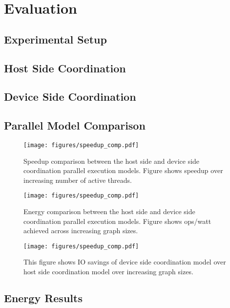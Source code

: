 
\section{Evaluation} \label{sec:eval}

\subsection{Experimental Setup}

\subsection{Host Side Coordination}

\subsection{Device Side Coordination}

\subsection{Parallel Model Comparison}

\begin{figure}[t]
	\centering
	\texttt{[image: figures/speedup\_comp.pdf]}
	\caption{Speedup comparison between the host side and device side coordination parallel execution models. Figure shows speedup over increasing number of active threads.}
    \label{fig:speedup_comp}
\end{figure}

\begin{figure}[t]
	\centering
	\texttt{[image: figures/speedup\_comp.pdf]}
	\caption{Energy comparison between the host side and device side coordination parallel execution models. Figure shows ops/watt achieved across increasing graph sizes.}
	\label{fig:energy_comp}
\end{figure}

\begin{figure}[t]
	\centering
	\texttt{[image: figures/speedup\_comp.pdf]}
	\caption{This figure shows IO savings of device side coordination model over host side coordination model over increasing graph sizes.}
	\label{fig:ioreduction}
\end{figure}



\subsection{Energy Results}
